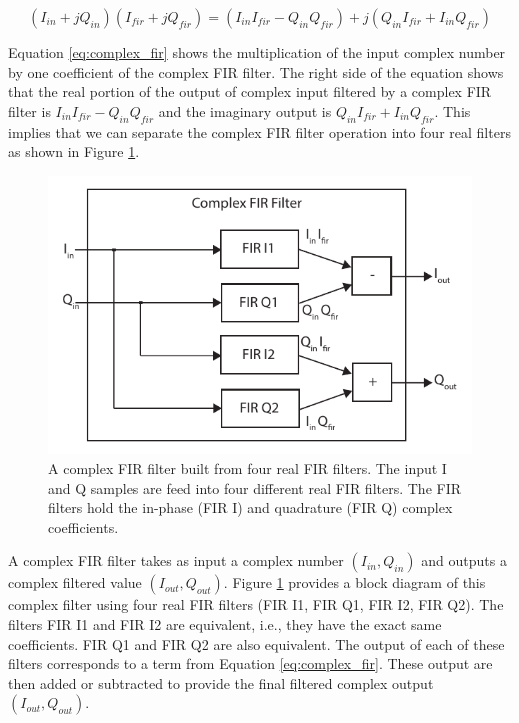 \begin{equation}
(I_{in} + j  Q_{in})(I_{fir} + j  Q_{fir}) = (I_{in} I_{fir} - Q_{in}  Q_{fir}) + j  (Q_{in}  I_{fir} + I_{in} Q_{fir})
\label{eq:complex_fir}
\end{equation}

Equation \ref{eq:complex_fir} shows the multiplication of the input complex number by one coefficient of the complex FIR filter. The right side of the equation shows that the real portion of the output of complex input filtered by a complex FIR filter is $I_{in} I_{fir} - Q_{in}  Q_{fir}$ and the imaginary output is $Q_{in}  I_{fir} + I_{in} Q_{fir}$. This implies that we can separate the complex FIR filter operation into four real filters as shown in Figure \ref{fig:complex_fir}.

\begin{figure}
\centering
\includegraphics[width=6in]{images/complex_fir}
\caption{A complex FIR filter built from four real FIR filters. The input I and Q samples are feed into four different real FIR filters. The FIR filters hold the in-phase (FIR I) and quadrature (FIR Q) complex coefficients. }
\label{fig:complex_fir}
\end{figure}

A complex FIR filter takes as input a complex number $(I_{in},Q_{in})$ and outputs a complex filtered value $(I_{out},Q_{out})$. Figure \ref{fig:complex_fir} provides a block diagram of this complex filter using four real FIR filters (FIR I1, FIR Q1, FIR I2, FIR Q2). The filters FIR I1 and FIR I2 are equivalent, i.e., they have the exact same coefficients. FIR Q1 and FIR Q2 are also equivalent. The output of each of these filters corresponds to a term from Equation \ref{eq:complex_fir}. These output are then added or subtracted to provide the final filtered complex output $(I_{out}, Q_{out})$. 

